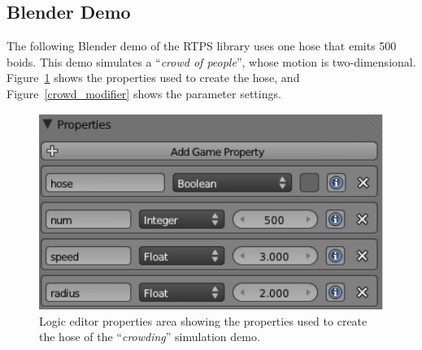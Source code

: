 \subsection{Blender Demo}

The following Blender demo of the RTPS library uses one hose that emits 500 boids. This demo simulates a ``\textit{crowd of people}'', whose motion is two-dimensional. Figure~\ref{crowd_prop} shows the properties used to create the hose, and Figure~\ref{crowd_modifier} shows the parameter settings. 

\begin{figure}[htbp]
\begin{center}
\includegraphics[scale=0.7]{figures/demo_crowds_prop.pdf}
\caption{Logic editor properties area showing the properties used to create the hose of the ``\textit{crowding}'' simulation demo.}
\label{crowd_prop}
\end{center}
\end{figure}

